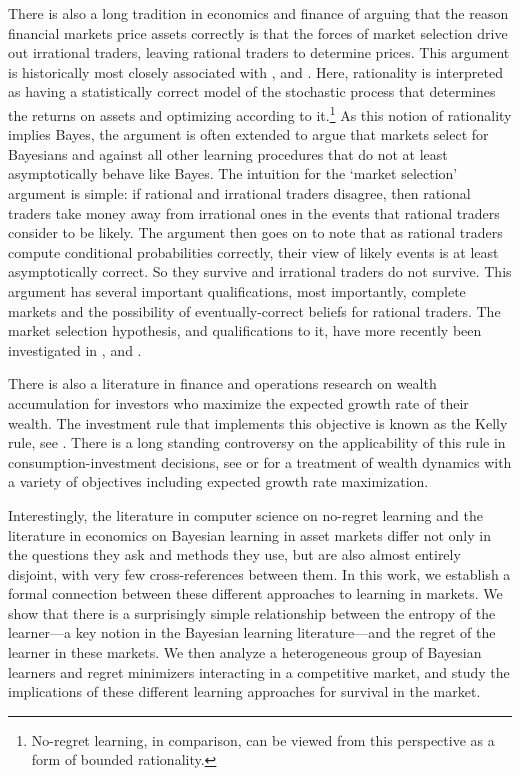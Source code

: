 There is also a long tradition in economics and finance of arguing that the reason financial markets price assets correctly is that the forces of market selection drive out irrational traders, leaving rational traders to determine prices. This argument is historically most closely associated with \cite{alchain1950}, \cite{friedman1953} and \cite{fama1965}. 
Here, rationality is interpreted as having a statistically correct model of the stochastic process that determines the returns on assets and optimizing according to it.\footnote{No-regret learning, in comparison, can be viewed from this perspective as a form of bounded rationality.} As this notion of rationality implies Bayes, the argument is often extended to argue that markets select for Bayesians and against all other learning procedures that do not at least asymptotically behave like Bayes. The intuition for the `market selection' argument is simple: if rational and irrational traders disagree, then rational traders take money away from irrational ones in the events that rational traders consider to be likely. The argument then goes on to note that as rational traders compute conditional probabilities correctly, their view of likely events is at least asymptotically correct. So they survive and irrational traders do not survive. This argument has several important qualifications, most importantly, complete markets and the possibility of eventually-correct beliefs for rational traders. The market selection hypothesis, and qualifications to it, have more recently been investigated in \cite{blumeeasley1992}, \cite{sandroni2000} and \cite{blumeeasley2006}. 

There is also a literature in finance and operations research on wealth accumulation for investors who maximize the expected growth rate of their wealth. The investment rule that implements this objective is known as the Kelly rule, see \cite{Kelly1956}. There is a long standing controversy on the applicability of this rule in consumption-investment decisions, see \cite{Samuelson1971fallacy} or \cite{Hens2009} for a treatment of wealth dynamics with a variety of objectives including expected growth rate maximization. 

Interestingly, the literature in computer science on no-regret learning and the literature in economics on Bayesian learning in asset markets differ not only in the questions they ask and methods they use, but are also almost entirely disjoint, with very few cross-references between them. In this work, we establish a formal connection between these different approaches to learning in markets. We show that there is a surprisingly simple relationship between the entropy of the learner---a key notion in the Bayesian learning literature---and the regret of the learner in these markets. We then analyze a heterogeneous group of Bayesian learners and regret minimizers interacting in a competitive market, and study the implications of these different learning approaches for survival in the market.

